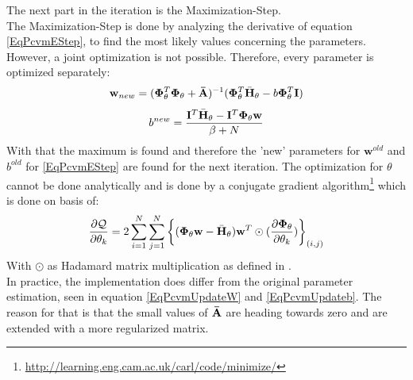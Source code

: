 The next part in the iteration is the Maximization-Step.\cite{Chen.2009}\\
The Maximization-Step is done by analyzing the derivative of equation \ref{EqPcvmEStep}, to find the most likely values concerning the parameters.
However, a joint optimization is not possible. Therefore, every parameter is optimized separately:\cite{Chen.2009}
\begin{equation}\label{EqPcvmUpdateW}
\mathbf{w}_{new} = (\mathbf{\Phi}_\theta^T \mathbf{\Phi}_\theta + \mathbf{\bar{A}})^{-1} (\mathbf{\Phi}_\theta^T \bar{\mathbf{H}}_\theta - b\mathbf{\Phi}_\theta^T \mathbf{I})
\end{equation}
\begin{equation}\label{EqPcvmUpdateb}
b^{new} = \frac{\mathbf{I}^T \bar{\mathbf{H}}_\theta - \mathbf{I}^T \mathbf{\Phi}_\theta \mathbf{w}}{\beta + N}
\end{equation}
With that the maximum is found and therefore the 'new' parameters for $\mathbf{w}^{old}$ and $b^{old}$ for \ref{EqPcvmEStep} are found for the next iteration.
The optimization for $\theta$ cannot be done analytically and is done by a conjugate gradient algorithm\footnote{\url{http://learning.eng.cam.ac.uk/carl/code/minimize/}} which is done on basis of:\cite{Chen.2009}
\begin{equation}\label{EqPcvmDevTheta}
\frac{\partial \mathcal{Q}}{\partial \mathbf{\theta}_k } = 2 \sum_{i=1}^{N}\sum_{j=1}^{N} \bigg\{ (\mathbf{\Phi}_\theta \mathbf{w} - \bar{\mathbf{H}}_\theta) \mathbf{w}^T \odot (\frac{\partial\mathbf{\Phi}_\theta}{\partial \theta_k} ) \bigg\}_{(i,j)}
\end{equation}
With $\odot$ as Hadamard matrix multiplication as defined in \cite{CaroLopera.2012}.\\
In practice, the implementation does differ from the original parameter estimation, seen in equation \ref{EqPcvmUpdateW} and \ref{EqPcvmUpdateb}. 
The reason for that is that the small values of $\mathbf{\bar{A}}$ are heading towards zero and are extended with a more regularized matrix.\cite{Chen.2009} 
